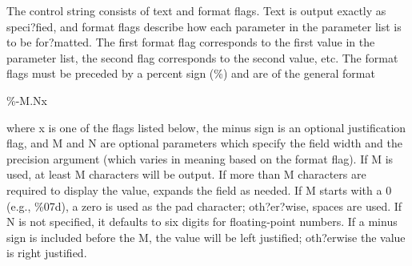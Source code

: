 \documentclass[letterpaper,10pt,english]{sphinxmanual}
\begin{document}
The control string consists of text and format flags. Text is output
exactly as speci?fied, and format flags describe how each parameter in
the parameter list is to be for?matted. The first format flag
corresponds to the first value in the parameter list, the second flag
corresponds to the second value, etc. The format flags must be preceded
by a percent sign (\%) and are of the general format

\%-M.Nx

where x is one of the flags listed below, the minus sign is an optional
justification flag, and M and N are optional parameters which specify
the field width and the precision argument (which varies in meaning
based on the format flag). If M is used, at least M characters will be
output. If more than M characters are required to display the value,
 expands the field as needed. If M starts with a 0 (e.g.,
\%07d), a zero is used as the pad character; oth?er?wise, spaces are
used. If N is not specified, it defaults to six digits for
floating-point numbers. If a minus sign is included before the M, the
value will be left justified; oth?erwise the value is right justified.
\end{document}
